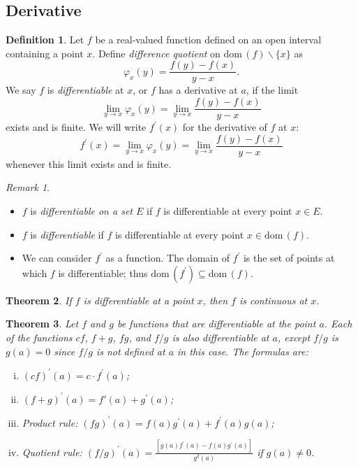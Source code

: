 \documentclass[12pt, lettersize]{book}
\theoremstyle{plain}
\newtheorem{thm}{Theorem}[section]
\theoremstyle{definition}
\newtheorem{dfn}[thm]{Definition}
\theoremstyle{remark}
\newtheorem*{rem}{Remark}
\newcommand{\dom}{\text{dom}\,}
\begin{document}
		\subsection*{Derivative}
		\begin{dfn}\label{def:28.1}
			Let $f$ be a real-valued function defined on an open interval containing a point $x$. Define \emph{difference quotient} on $\dom(f)\backslash\{x\}$ as 
			\begin{displaymath}
				\varphi_x(y)=\frac{f(y)-f(x)}{y-x}.
			\end{displaymath}
			We say $f$ is \emph{differentiable} at $x$, or $f$ has a derivative at $a$, if the limit
			\begin{displaymath}
				\lim_{y\rightarrow x}\varphi_x(y)=\lim_{y\rightarrow x}\frac{f(y)-f(x)}{y-x}
			\end{displaymath}
			exists and is finite. We will write $f^\prime(x)$ for the derivative of $f$ at $x$:
			\begin{displaymath}
				f^\prime(x)=\lim_{y\rightarrow x}\varphi_x(y)=\lim_{y\rightarrow x}\frac{f(y)-f(x)}{y-x}
			\end{displaymath}
			whenever this limit exists and is finite.
		\end{dfn}
		\begin{rem}
			\begin{itemize}
				\item $f$ is \emph{differentiable on a set $E$} if $f$ is differentiable at every point $x\in E$.
				\item $f$ is \emph{differentiable} if $f$ is differentiable at every point $x\in\dom(f)$.
				\item We can consider $f^\prime$ as a function. The domain of $f^\prime$ is the set of points at which $f$ is differentiable; thus $\dom(f^\prime)\subseteq\dom(f)$.
			\end{itemize}
		\end{rem}
		
		\begin{thm}\label{thm:28.2}
			If $f$ is differentiable at a point $x$, then $f$ is continuous at $x$.
		\end{thm}
		\newpage
		
		\begin{thm}\label{def:28.3}
			Let $f$ and $g$ be functions that are differentiable at the point $a$. Each of the functions $cf$, $f+g$, $fg$, and $f/g$ is also differentiable at $a$, except $f/g$ is $g(a)=0$ since $f/g$ is not defined at $a$ in this case.
			The formulas are:
			\begin{enumerate}[(i)]
				\item $(cf)^\prime(a)=c\cdot f^\prime(a)$;
				\item $(f+g)^\prime(a)=f\prime(a)+g^\prime(a)$;
				\item Product rule: $(fg)^\prime(a)=f(a)g^\prime(a)+f^\prime(a)g(a)$;
				\item Quotient rule: $(f/g)^\prime(a)=\frac{[g(a)f^\prime(a)-f(a)g^\prime(a)]}{g^2(a)}$ if $g(a)\neq0$.
			\end{enumerate}
		\end{thm}
		
\end{document}
